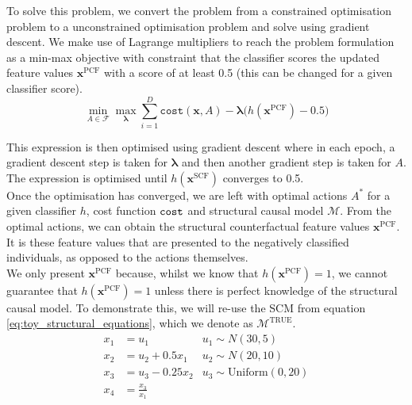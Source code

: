 To solve this problem, we convert the problem from a constrained optimisation problem to a unconstrained optimisation problem and solve using gradient descent. We make use of Lagrange multipliers to reach the problem formulation as a min-max objective with constraint that the classifier scores the updated feature values $\mathbf{x}^{\text{PCF}}$ with a score of at least 0.5 (this can be changed for a given classifier score).\\

\begin{equation} \label{eq:lagrange}
	\min_{A \in \mathcal{F}} \max_{\boldsymbol{\lambda}} \sum_{i=1}^D \texttt{cost}(\mathbf{x}, A) - \boldsymbol{\lambda} \bigg( h(\mathbf{x}^{\text{PCF}}) - 0.5\bigg)
\end{equation}

This expression is then optimised using gradient descent where in each epoch, a gradient descent step is taken for $\boldsymbol{\lambda}$ and then another gradient step is taken for $A$. The expression is optimised until $h(\mathbf{x}^{\text{SCF}})$ converges to 0.5.\\

Once the optimisation has converged, we are left with optimal actions $A^*$ for a given classifier $h$, cost function $\operatorname*{\texttt{cost}}$ and structural causal model $\mathcal{M}$. From the optimal actions, we can obtain the structural counterfactual feature values $\mathbf{x}^{\text{PCF}}$. It is these feature values that are presented to the negatively classified individuals, as opposed to the actions themselves.\\

We only present $\mathbf{x}^{\text{PCF}}$ because, whilst we know that $h(\mathbf{x}^{\text{PCF}})=1$, we cannot guarantee that $h(\mathbf{x}^{\text{PCF}})=1$ 
unless there is perfect knowledge of the structural causal model. To demonstrate this, we will re-use the SCM from equation \ref{eq:toy_structural_equations}, which we denote as $\mathcal{M}^{\text{TRUE}}$.\\

\begin{align}
	x_1 & = u_1 & u_1 \sim N(30 , 5) \\ \nonumber %
	x_2 & = u_2 + 0.5x_1 & u_2 \sim N(20, 10) \\ \nonumber %
	x_3 & = u_3 - 0.25x_2 & u_3 \sim \text{Uniform}(0, 20) \\ \nonumber %
	x_4 & = \frac{x_3}{x_1} %
\end{align}

